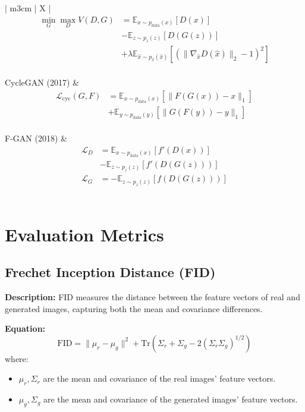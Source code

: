 \documentclass{article}
\begin{document}
\begin{table}[H]
\begin{tabularx}{\textwidth}{| m{3cm} | X |}
\[\begin{aligned}
\min_G \max_D V(D, G) &= \mathbb{E}_{x \sim p_{\text{data}}(x)} [D(x)] \\
&- \mathbb{E}_{z \sim p_z(z)} [D(G(z))] \\
&+ \lambda \mathbb{E}_{\hat{x} \sim p_{\hat{x}}(\hat{x})} 
\end{aligned}
\] \\
\hline
CycleGAN (2017) & 
\[
\begin{aligned}
\mathcal{L}_{\text{cyc}}(G, F) &= \mathbb{E}_{x \sim p_{\text{data}}(x)} [\|F(G(x)) - x\|_1] \\
&+ \mathbb{E}_{y \sim p_{\text{data}}(y)} [\|G(F(y)) - y\|_1]
\end{aligned}
\] \\
\hline
F-GAN (2018) & 
\[
\begin{aligned}
\mathcal{L}_D &= \mathbb{E}_{x \sim p_{\text{data}}(x)} [f'(D(x))] \\
&- \mathbb{E}_{z \sim p_z(z)} [f'(D(G(z)))] \\
\mathcal{L}_G &= -\mathbb{E}_{z \sim p_z(z)} [f(D(G(z)))]
\end{aligned}
\] \\
\hline
\end{tabularx}
\caption{Loss functions for various generative models}
\label{tab:loss-functions}
\end{table}


\section{Evaluation Metrics}
\label{sec:evaluation-metrics}

\subsection{Frechet Inception Distance (FID)}
\textbf{Description:} FID measures the distance between the feature vectors of real and generated images, capturing both the mean and covariance differences.

\textbf{Equation:}
\[
\text{FID} = \|\mu_r - \mu_g\|^2 + \text{Tr}(\Sigma_r + \Sigma_g - 2(\Sigma_r \Sigma_g)^{1/2})
\]
where:
\begin{itemize}
    \item \(\mu_r, \Sigma_r\) are the mean and covariance of the real images' feature vectors.
    \item \(\mu_g, \Sigma_g\) are the mean and covariance of the generated images' feature vectors.
\end{itemize}
\end{document}

